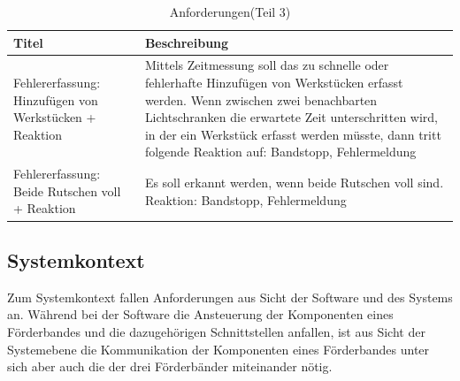 \documentclass[a4paper, 11pt]{article}
\begin{document}
\newpage

\begin{table}[h]
\center
\begin{tabularx}{\textwidth}{|X|X|}
\hline
\textbf{Titel}&\textbf{Beschreibung}\\
\hline
Fehlererfassung: Hinzufügen von Werkstücken + Reaktion&Mittels Zeitmessung soll das zu schnelle oder fehlerhafte Hinzufügen von Werkstücken erfasst werden. Wenn zwischen zwei benachbarten Lichtschranken die erwartete Zeit unterschritten wird, in der ein Werkstück erfasst werden müsste, dann tritt folgende Reaktion auf: Bandstopp, Fehlermeldung \\
\hline
Fehlererfassung: Beide Rutschen voll + Reaktion&Es soll erkannt werden, wenn beide Rutschen voll sind. Reaktion: Bandstopp, Fehlermeldung \\
\hline
\end{tabularx}
\caption{Anforderungen(Teil 3)}
\label{anf3}
\end{table}

\newpage
\subsection{Systemkontext}
Zum Systemkontext fallen Anforderungen aus Sicht der Software und des Systems an. Während bei der Software die Ansteuerung der Komponenten eines Förderbandes und die dazugehörigen Schnittstellen anfallen, ist aus Sicht der Systemebene die Kommunikation der Komponenten eines Förderbandes unter sich aber auch die der drei Förderbänder miteinander nötig. 
\end{document}
